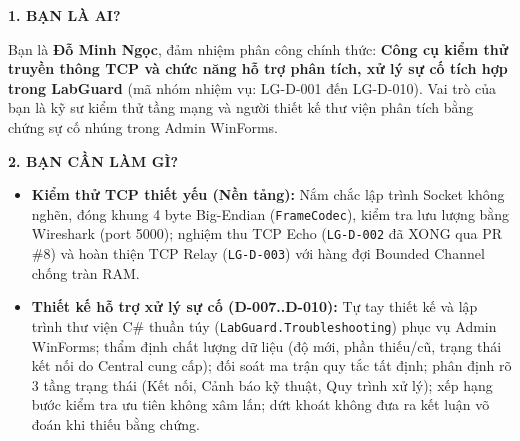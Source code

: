 \documentclass[12pt,a4paper]{article}
\begin{document}
\begin{tcolorbox}[enhanced, colback=lgLightTeal, colframe=lgTeal, boxrule=0.8pt, arc=1.5mm, top=1.8mm, bottom=1.8mm, left=2.5mm, right=2.5mm]
{\bfseries\color{lgTeal} 1. BẠN LÀ AI?}\par
\vspace{0.5mm}
Bạn là \textbf{Đỗ Minh Ngọc}, đảm nhiệm phân công chính thức: \textbf{Công cụ kiểm thử truyền thông TCP và chức năng hỗ trợ phân tích, xử lý sự cố tích hợp trong LabGuard} (mã nhóm nhiệm vụ: LG-D-001 đến LG-D-010). Vai trò của bạn là kỹ sư kiểm thử tầng mạng và người thiết kế thư viện phân tích bằng chứng sự cố nhúng trong Admin WinForms.
\end{tcolorbox}
\vspace{1.5mm}

\begin{tcolorbox}[enhanced, colback=lgLightBlue, colframe=lgDeepBlue, boxrule=0.8pt, arc=1.5mm, top=1.8mm, bottom=1.8mm, left=2.5mm, right=2.5mm]
{\bfseries\color{lgDeepBlue} 2. BẠN CẦN LÀM GÌ?}\par
\vspace{0.5mm}
\begin{itemize}[leftmargin=1.5em, itemsep=0.5pt, parsep=0pt, topsep=1pt]
  \item \textbf{Kiểm thử TCP thiết yếu (Nền tảng):} Nắm chắc lập trình Socket không nghẽn, đóng khung 4 byte Big-Endian (\texttt{FrameCodec}), kiểm tra lưu lượng bằng Wireshark (port 5000); nghiệm thu TCP Echo (\texttt{LG-D-002} đã XONG qua PR \#8) và hoàn thiện TCP Relay (\texttt{LG-D-003}) với hàng đợi Bounded Channel chống tràn RAM.
  \item \textbf{Thiết kế hỗ trợ xử lý sự cố (D-007..D-010):} Tự tay thiết kế và lập trình thư viện C\# thuần túy (\texttt{LabGuard.Troubleshooting}) phục vụ Admin WinForms; thẩm định chất lượng dữ liệu (độ mới, phần thiếu/cũ, trạng thái kết nối do Central cung cấp); đối soát ma trận quy tắc tất định; phân định rõ 3 tầng trạng thái (Kết nối, Cảnh báo kỹ thuật, Quy trình xử lý); xếp hạng bước kiểm tra ưu tiên không xâm lấn; dứt khoát không đưa ra kết luận võ đoán khi thiếu bằng chứng.
\end{itemize}
\end{tcolorbox}
\vspace{1.5mm}
\end{document}
